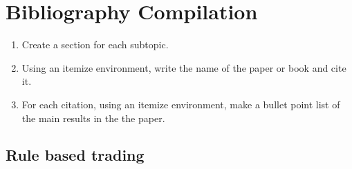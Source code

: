 \clearpage\mbox{}
\chapter{Bibliography Compilation}
\label{chapter:BibliographyCompilation}


\begin{enumerate}
    \item Create a section for each subtopic.
    \item Using an itemize environment, write the name of the paper or book and cite it. 
    \item For each citation, using an itemize environment, make a bullet point list of the main results in the  the paper. 
\end{enumerate}


\section{Rule based trading}

